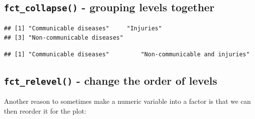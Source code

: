 \documentclass[]{book}
\makeatletter
\newenvironment{Shaded}{\begin{snugshade}}{\end{snugshade}}
\newcommand{\KeywordTok}[1]{\textcolor[rgb]{0.13,0.29,0.53}{\textbf{#1}}}
\newcommand{\StringTok}[1]{\textcolor[rgb]{0.31,0.60,0.02}{#1}}
\newcommand{\OperatorTok}[1]{\textcolor[rgb]{0.81,0.36,0.00}{\textbf{#1}}}
\newcommand{\NormalTok}[1]{#1}
\newenvironment{kframe}{%
\medskip{}
\setlength{\fboxsep}{.8em}
 \def\at@end@of@kframe{}%
 \ifinner\ifhmode%
  \def\at@end@of@kframe{\end{minipage}}%
  \begin{minipage}{\columnwidth}%
 \fi\fi%
 \def\FrameCommand##1{\hskip\@totalleftmargin \hskip-\fboxsep
 \colorbox{shadecolor}{##1}\hskip-\fboxsep
     \hskip-\linewidth \hskip-\@totalleftmargin \hskip\columnwidth}%
 \MakeFramed {\advance\hsize-\width
   \@totalleftmargin\z@ \linewidth\hsize
   \@setminipage}}%
 {\par\unskip\endMakeFramed%
 \at@end@of@kframe}
\renewenvironment{Shaded}{\begin{kframe}}{\end{kframe}}
\makeatother
\begin{document}
\subsection{\texorpdfstring{\texttt{fct\_collapse()} - grouping levels
together}{fct\_collapse() - grouping levels together}}\label{fct_collapse---grouping-levels-together}

\begin{Shaded}
\end{Shaded}

\begin{verbatim}
## [1] "Communicable diseases"     "Injuries"                 
## [3] "Non-communicable diseases"
\end{verbatim}

\begin{Shaded}
\end{Shaded}

\begin{verbatim}
## [1] "Communicable diseases"         "Non-communicable and injuries"
\end{verbatim}

\subsection{\texorpdfstring{\texttt{fct\_relevel()} - change the order
of
levels}{fct\_relevel() - change the order of levels}}\label{fct_relevel---change-the-order-of-levels}

Another reason to sometimes make a numeric variable into a factor is
that we can then reorder it for the plot:
\end{document}
